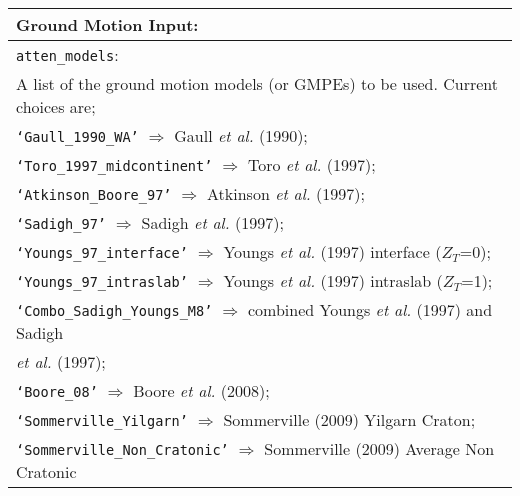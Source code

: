 \documentclass[a4paper, 12pt]{report}
\begin{document}
\vspace{2em}
\begin{tabular}{|p{\textwidth}|}
\hline
\vspace{0.3em} \noindent \Large \textbf{Ground Motion Input:} \normalsize \\
\hline \vspace{0.1em} \texttt{atten\_models}: \\
A list of the ground motion models (or GMPEs) to be used. Current choices are; \\
 \hspace{0.5em} \texttt{`Gaull\_1990\_WA'} $\Rightarrow$ Gaull \textit{et al.} (1990); \\
 \hspace{0.5em}  \texttt{`Toro\_1997\_midcontinent'}  $\Rightarrow$ Toro \textit{et al.} (1997); \\
 \hspace{0.5em}  \texttt{`Atkinson\_Boore\_97'}  $\Rightarrow$ Atkinson \textit{et al.} (1997); \\
 \hspace{0.5em}  \texttt{`Sadigh\_97'}  $\Rightarrow$ Sadigh \textit{et al.} (1997); \\
 \hspace{0.5em}  \texttt{`Youngs\_97\_interface'}  $\Rightarrow$ Youngs \textit{et al.} (1997) interface ($Z_T$=0); \\
 \hspace{0.5em}  \texttt{`Youngs\_97\_intraslab'}  $\Rightarrow$ Youngs \textit{et al.} (1997) intraslab ($Z_T$=1); \\
 \hspace{0.5em}  \texttt{`Combo\_Sadigh\_Youngs\_M8'}  $\Rightarrow$ combined Youngs \textit{et al.} (1997) and Sadigh \\
 \hspace{14.5em} \textit{et al.} (1997); \\
 \hspace{0.5em}  \texttt{`Boore\_08'}  $\Rightarrow$ Boore \textit{et al.} (2008); \\
 \hspace{0.5em} \texttt{`Sommerville\_Yilgarn'} $\Rightarrow$ Sommerville (2009) Yilgarn Craton; \\
  \hspace{0.5em} \texttt{`Sommerville\_Non\_Cratonic'} $\Rightarrow$ Sommerville (2009) Average Non Cratonic \\

\end{tabular}
\end{document}
